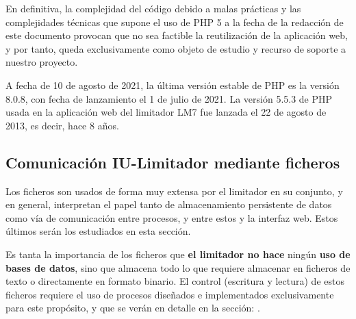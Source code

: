 En definitiva, la complejidad del código debido a malas prácticas y las complejidades técnicas que supone el uso de PHP 5 a la fecha de la redacción de este documento provocan que no sea factible la reutilización de la aplicación web, y por tanto, queda exclusivamente como objeto de estudio y recurso de soporte a nuestro proyecto.

\begin{shaded}
    \noindent
    A fecha de 10 de agosto de 2021, la última versión estable de PHP es la versión 8.0.8, con fecha de lanzamiento el 1 de julio de 2021. La versión 5.5.3 de PHP usada en la aplicación web del limitador \acrshort{LM7} fue lanzada el 22 de agosto de 2013, es decir, hace 8 años.
\end{shaded}

\subsection{Comunicación IU-Limitador mediante ficheros} \label{sec:iu-limitador-ficheros}

Los ficheros son usados de forma muy extensa por el limitador en su conjunto, y en general, interpretan el papel tanto de almacenamiento persistente de datos como vía de comunicación entre procesos, y entre estos y la interfaz web. Estos últimos serán los estudiados en esta sección.

Es tanta la importancia de los ficheros que \textbf{el limitador no hace} ningún \textbf{uso de bases de datos}, sino que almacena todo lo que requiere almacenar en ficheros de texto o directamente en formato binario. El control (escritura y lectura) de estos ficheros requiere el uso de procesos diseñados e implementados exclusivamente para este propósito, y que se verán en detalle en la sección: .

